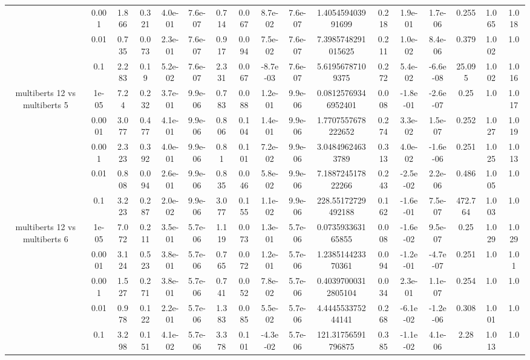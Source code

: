 \begin{tabular}{|c|c|c|c|c|c|c|c|c|c|c|c|c|c|c|c|c|}
 & 0.001 & 1.866 & 0.321 & 4.0e-01 & 7.6e-07 & 0.714 & 0.067 & 8.7e-02 & 7.6e-07 & 1.405459403991699 & 0.218 & 1.9e-01 & 1.7e-06 & 0.255 & 1.065 & 1.018 \\
 & 0.01 & 0.735 & 0.073 & 2.3e-01 & 7.6e-07 & 0.917 & 0.094 & 7.5e-02 & 7.6e-07 & 7.3985748291015625 & 0.211 & 1.0e-02 & 8.4e-06 & 0.379 & 1.002 & 1.0 \\
 & 0.1 & 2.283 & 0.19 & 5.2e-02 & 7.6e-07 & 2.331 & 0.067 & -8.7e-03 & 7.6e-07 & 5.61956787109375 & 0.272 & 5.4e-02 & -6.6e-08 & 25.095 & 1.002 & 1.016 \\
\hline
\multirow{5}{*}{multiberts 12 vs multiberts 5} & 1e-05 & 7.24 & 0.232 & 3.7e-01 & 9.9e-06 & 0.783 & 0.088 & 1.2e-01 & 9.9e-06 & 0.08125769346952401 & 0.008 & -1.8e-01 & -2.6e-07 & 0.25 & 1.0 & 1.017 \\
 & 0.0001 & 3.077 & 0.477 & 4.1e-01 & 9.9e-06 & 0.806 & 0.104 & 1.4e-01 & 9.9e-06 & 1.7707557678222652 & 0.274 & 3.3e-02 & 1.5e-07 & 0.252 & 1.027 & 1.019 \\
 & 0.001 & 2.323 & 0.392 & 4.0e-01 & 9.9e-06 & 0.81 & 0.101 & 7.2e-02 & 9.9e-06 & 3.04849624633789 & 0.313 & 4.0e-02 & -1.6e-06 & 0.251 & 1.025 & 1.013 \\
 & 0.01 & 0.808 & 0.094 & 2.6e-01 & 9.9e-06 & 0.835 & 0.046 & 5.8e-02 & 9.9e-06 & 7.188724517822266 & 0.243 & -2.5e-02 & 2.2e-06 & 0.486 & 1.005 & 1.0 \\
 & 0.1 & 3.223 & 0.287 & 2.0e-02 & 9.9e-06 & 3.077 & 0.155 & 1.1e-02 & 9.9e-06 & 228.55172729492188 & 0.162 & -1.6e-01 & 7.5e-07 & 472.764 & 1.003 & 1.0 \\
\hline
\multirow{5}{*}{multiberts 12 vs multiberts 6} & 1e-05 & 7.072 & 0.211 & 3.5e-01 & 5.7e-06 & 1.119 & 0.073 & 1.3e-01 & 5.7e-06 & 0.073593363165855 & 0.008 & -1.6e-02 & 9.5e-07 & 0.25 & 1.029 & 1.029 \\
 & 0.0001 & 3.124 & 0.523 & 3.8e-01 & 5.7e-06 & 0.765 & 0.072 & 1.2e-01 & 5.7e-06 & 1.238514423370361 & 0.094 & -1.2e-01 & -4.7e-07 & 0.251 & 1.0 & 1.01 \\
 & 0.001 & 1.527 & 0.271 & 3.8e-01 & 5.7e-06 & 0.741 & 0.052 & 7.8e-02 & 5.7e-06 & 0.40397000312805104 & 0.034 & 2.3e-01 & 1.1e-07 & 0.254 & 1.0 & 1.0 \\
 & 0.01 & 0.978 & 0.122 & 2.2e-01 & 5.7e-06 & 1.383 & 0.085 & 5.5e-02 & 5.7e-06 & 4.444553375244141 & 0.268 & -6.1e-02 & -1.2e-06 & 0.308 & 1.001 & 1.0 \\
 & 0.1 & 3.298 & 0.151 & 4.1e-02 & 5.7e-06 & 3.378 & 0.101 & -4.3e-02 & 5.7e-06 & 121.31756591796875 & 0.385 & -1.1e-02 & 4.1e-06 & 2.28 & 1.013 & 1.0 \\

\end{tabular}
